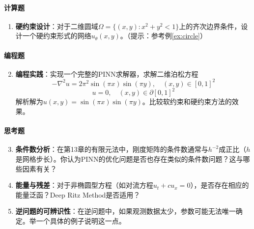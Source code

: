 \paragraph{计算题}
\begin{enumerate}
    \item \textbf{硬约束设计}：对于二维圆域$\Omega = \{(x, y) : x^2 + y^2 < 1\}$上的齐次边界条件，设计一个硬约束形式的网络$u_\theta(x, y)$。（提示：参考例\ref{ex:circle}）
    
\end{enumerate}

\paragraph{编程题}
\begin{enumerate}
    \setcounter{enumi}{1}
    \item \textbf{编程实践}：实现一个完整的PINN求解器，求解二维泊松方程
    \begin{equation}
        -\nabla^2 u = 2\pi^2 \sin(\pi x)\sin(\pi y), \quad (x, y) \in [0, 1]^2
    \end{equation}
    \begin{equation}
        u = 0, \quad (x, y) \in \partial[0, 1]^2
    \end{equation}
    解析解为$u(x, y) = \sin(\pi x)\sin(\pi y)$。比较软约束和硬约束方法的效果。
\end{enumerate}

\paragraph{思考题}
\begin{enumerate}
    \setcounter{enumi}{2}
    \item \textbf{条件数分析}：在第13章的有限元法中，刚度矩阵的条件数通常与$h^{-2}$成正比（$h$是网格步长）。你认为PINN的优化问题是否也存在类似的条件数问题？这与哪些因素有关？
    
    
    \item \textbf{能量与残差}：对于非椭圆型方程（如对流方程$u_t + c u_x = 0$），是否存在相应的能量泛函？Deep Ritz Method是否适用？
    
    
    \item \textbf{逆问题的可辨识性}：在逆问题中，如果观测数据太少，参数可能无法唯一确定。举一个具体的例子说明这一点。
    
\end{enumerate}

% 